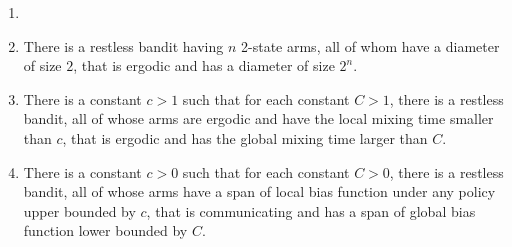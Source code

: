 \begin{thm}
    \label{thm:parameters}
    \begin{enumerate}[label=(\roman*)]
        \item[]
        \item \label{thm:diam} There is a restless bandit having $n$ 2-state arms, all of whom have a diameter of size $2$, that is ergodic and has a diameter of size $2^n$. %
        \item \label{thm:mixing} There is a constant $c>1$ such that for each constant $C>1$, there is a restless bandit, all of whose arms are ergodic and have the local mixing time smaller than $c$, that is ergodic and has the global mixing time larger than $C$.
        \item \label{thm:span} There is a constant $c>0$ such that for each constant $C>0$, there is a restless bandit, all of whose arms have a span of local bias function under any policy upper bounded by $c$, that is communicating and has a span of global bias function lower bounded by $C$.
    \end{enumerate}
\end{thm}
